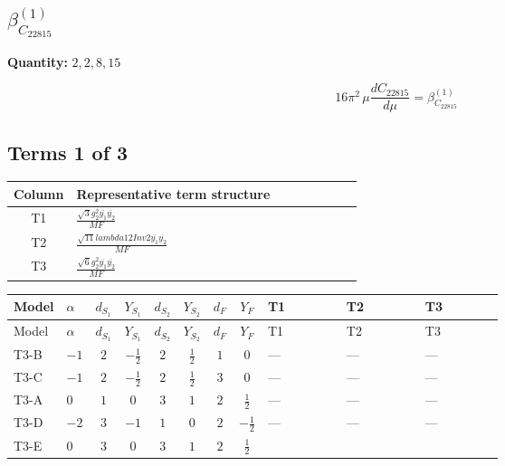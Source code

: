 \documentclass[8pt]{article}
\begin{document}
\begin{landscape}
\section*{$\beta_{C_{22815}}^{(1)}$}
\noindent\textbf{Quantity: }$\mathrm{2,2,8,15}$\par\smallskip
\[16\pi^2\,\mu\frac{d C_{22815}}{d\mu}=\beta_{C_{22815}}^{(1)}\]
\subsection*{Terms 1 of 3}
\begin{center}
\begin{tabular}{@{}c >{\raggedright\arraybackslash}p{0.82\linewidth}@{}}
\toprule
Column & Representative term structure \\
\midrule
T1 & \(\displaystyle \frac{\sqrt{3} g_{2}^{2} \overline{y_{1}} \overline{y_{2}}}{MF}\) \\
\midrule
T2 & \(\displaystyle \frac{\sqrt{11} lambda12Inv2 \overline{y_{1}} \overline{y_{2}}}{MF}\) \\
\midrule
T3 & \(\displaystyle \frac{\sqrt{6} g_{2}^{2} \overline{y_{1}} \overline{y_{2}}}{MF}\) \\
\midrule
\bottomrule
\end{tabular}
\end{center}
\smallskip
\tiny
\begin{longtable}{@{}llcccccc >{\raggedright\arraybackslash}p{0.21\linewidth} >{\raggedright\arraybackslash}p{0.21\linewidth} >{\raggedright\arraybackslash}p{0.21\linewidth}@{}}
\toprule
Model & $\alpha$ & $d_{S_1}$ & $Y_{S_1}$ & $d_{S_2}$ & $Y_{S_2}$ & $d_F$ & $Y_F$ & T1 & T2 & T3 \\
\midrule
\endfirsthead
\toprule
Model & $\alpha$ & $d_{S_1}$ & $Y_{S_1}$ & $d_{S_2}$ & $Y_{S_2}$ & $d_F$ & $Y_F$ & T1 & T2 & T3 \\
\midrule
\endhead
T3-B & $-1$ & $2$ & $-\frac{1}{2}$ & $2$ & $\frac{1}{2}$ & $1$ & $0$ & --- & --- & --- \\
\midrule
T3-C & $-1$ & $2$ & $-\frac{1}{2}$ & $2$ & $\frac{1}{2}$ & $3$ & $0$ & --- & --- & --- \\
\midrule
T3-A & $0$ & $1$ & $0$ & $3$ & $1$ & $2$ & $\frac{1}{2}$ & --- & --- & --- \\
\midrule
T3-D & $-2$ & $3$ & $-1$ & $1$ & $0$ & $2$ & $-\frac{1}{2}$ & --- & --- & --- \\
\midrule
T3-E & $0$ & $3$ & $0$ & $3$ & $1$ & $2$ & $\frac{1}{2}$ & \scriptsize\adjustbox{max width=\linewidth}{$\begin{gathered} - \frac{49 \sqrt{3} g_{2}^{2} \overline{y_{1}} \overline{y_{2}}}{24 MF}\end{gathered}$} & \scriptsize\adjustbox{max width=\linewidth}{$\begin{gathered} - \frac{3 \sqrt{11} lambda12Inv2 \overline{y_{1}} \overline{y_{2}}}{22 MF}\end{gathered}$} & \scriptsize\adjustbox{max width=\linewidth}{$\begin{gathered} - \frac{\sqrt{6} g_{2}^{2} \overline{y_{1}} \overline{y_{2}}}{3 MF}\end{gathered}$} \\

\end{longtable}
\end{landscape}
\end{document}
